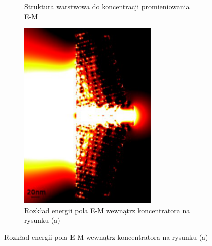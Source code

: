 \begin{figure}[!htb]
\begin{subfigure}[b]{.45\textwidth}
		\caption{Struktura warstwowa do koncentracji promieniowania E-M}
		\label{fig:old-concen-eps}
	\end{subfigure}
	\begin{subfigure}[b]{.45\textwidth}
		\includegraphics[angle=90,width=\textwidth]{images/multilayer/konc_ene_mgr.png}
		\caption{Rozkład energii pola E-M wewnątrz koncentratora na rysunku (a)}
		\label{fig:old-concen-pow}
	\end{subfigure}


\end{figure}
